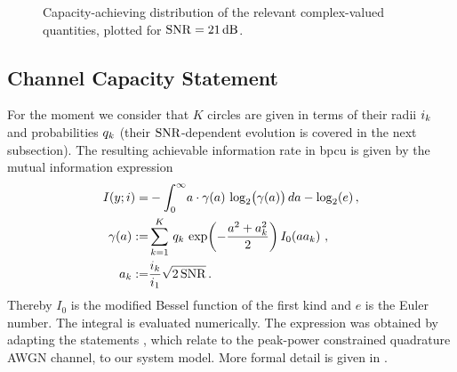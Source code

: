 \begin{figure}[!ht]
\centering
{}
\caption{Capacity-achieving distribution of the relevant complex-valued quantities, plotted for $\mathrm{SNR} = 21\,\mathrm{dB}$.}
\label{fig:CapAchievingDistr}
\end{figure}

\subsection{Channel Capacity Statement}

For the moment we consider that $K$ circles are given in terms of their radii $i_k$ and probabilities $q_k$ (their $\mathrm{SNR}$-dependent evolution is covered in the next subsection).
The resulting achievable information rate in bpcu is given by the mutual information expression
\begin{align}
I(y;i) =&
-\int_0^\infty\! a \cdot \gamma(a) \, \log_2\!\big( \gamma(a) \big)\,da - \log_2(e)
\label{eq:RateFromCircles} \, , \\
\gamma(a) :=&
\sum_{k = 1}^K \,
q_k \,\exp\!\left( -\frac{a^2 + a_k^2}{2} \right)
I_0\!\left( a a_k \right) \, , \\
a_k :=& \frac{i_k}{i_1} \sqrt{2\, \mathrm{SNR}}
\, .
\end{align}
Thereby $I_0$ is the modified Bessel function of the first kind and $e$ is the Euler number.
The integral is evaluated numerically. 
The expression  was obtained by adapting the statements \cite[Eq.~(4),(13),(11),(46)]{ShamaiTIT1995}, which relate to the peak-power constrained quadrature AWGN channel, to our system model. More formal detail is given in .


